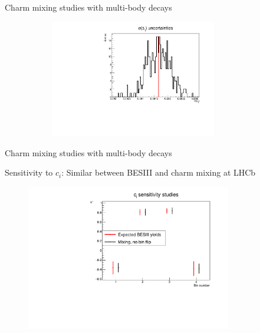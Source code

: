 \documentclass[xcolor={dvipsnames}]{beamer}
\begin{document}
\begin{frame}{Charm mixing studies with multi-body decays}
\begin{figure}[htb]
\begin{subfigure}{0.5\textwidth}
      \includegraphics[width=0.8\textwidth]{Plots/s_1_err_binflip_hist.pdf}
    \end{subfigure}
    \vspace{-0.5cm}
  \end{figure}
\end{frame}

\begin{frame}{Charm mixing studies with multi-body decays}
  \begin{center}
    {\large Sensitivity to $c_i$: Similar between BESIII and charm mixing at LHCb}
  \end{center}
  \begin{figure}[htb]
    \centering
    \includegraphics[width=0.8\textwidth]{Plots/ci_sensitivity.pdf}
  \end{figure}
\end{frame}
\end{document}
